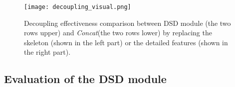 \documentclass[10pt,twocolumn,letterpaper]{article}
\begin{document}
\begin{figure}
	\begin{center}
		\texttt{[image: decoupling\_visual.png]}
		\caption{Decoupling effectiveness comparison between DSD module (the two rows upper) and \textit{Concat}(the two rows lower) by replacing the skeleton (shown in the left part) or the detailed features (shown in the right part).}
		\label{fig:decoupleresult}
	\end{center}
\end{figure}

\subsection{Evaluation of the DSD module\label{dsdeval}}

\begin{table*}
  \begin{center}
  \end{center}
  \caption{MPJVE(): Velocity error over the poses of the predicted 3D human meshes.}
   \label{tab:MPJVE}
\end{table*}
\end{document}
